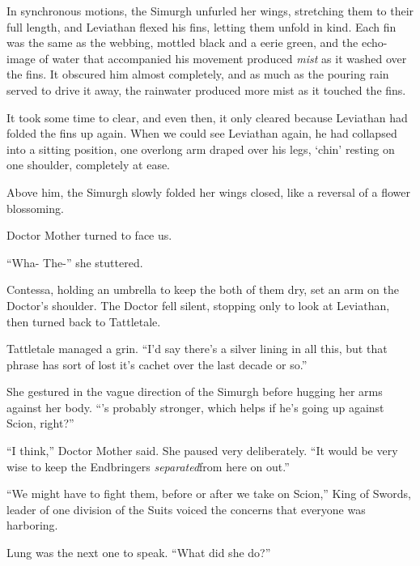 In synchronous motions, the Simurgh unfurled her wings, stretching them to their full length, and Leviathan flexed his fins, letting them unfold in kind.  Each fin was the same as the webbing, mottled black and a eerie green, and the echo-image of water that accompanied his movement produced \emph{mist} as it washed over the fins.  It obscured him almost completely, and as much as the pouring rain served to drive it away, the rainwater produced more mist as it touched the fins.



It took some time to clear, and even then, it only cleared because Leviathan had folded the fins up again.  When we could see Leviathan again, he had collapsed into a sitting position, one overlong arm draped over his legs, `chin' resting on one shoulder, completely at ease.



Above him, the Simurgh slowly folded her wings closed, like a reversal of a flower blossoming.



Doctor Mother turned to face us.



``Wha-  The-'' she stuttered.



Contessa, holding an umbrella to keep the both of them dry, set an arm on the Doctor's shoulder.  The Doctor fell silent, stopping only to look at Leviathan, then turned back to Tattletale.



Tattletale managed a grin.  ``I'd say there's a silver lining in all this, but that phrase has sort of lost it's cachet over the last decade or so.''



She gestured in the vague direction of the Simurgh before hugging her arms against her body.  ``\ldotsHe's probably stronger, which helps if he's going up against Scion, right?''



``I think,'' Doctor Mother said.  She paused very deliberately.  ``It would be very wise to keep the Endbringers \emph{separated}from here on out.''



``We might have to fight them, before or after we take on Scion,'' King of Swords, leader of one division of the Suits voiced the concerns that everyone was harboring.



Lung was the next one to speak.  ``What did she do?''



